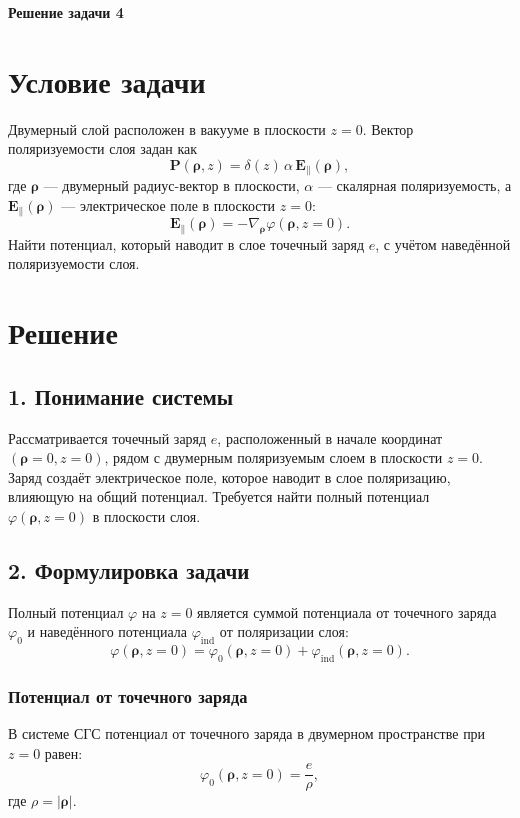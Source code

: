 \documentclass{article}
\begin{document}
\textbf{Решение задачи 4}

\section*{Условие задачи}

Двумерный слой расположен в вакууме в плоскости \( z = 0 \). Вектор поляризуемости слоя задан как
\[
\mathbf{P}(\bm{\rho}, z) = \delta(z)\, \alpha\, \mathbf{E}_{\parallel}(\bm{\rho}),
\]
где \( \bm{\rho} \) — двумерный радиус-вектор в плоскости, \( \alpha \) — скалярная поляризуемость, а \( \mathbf{E}_{\parallel}(\bm{\rho}) \) — электрическое поле в плоскости \( z = 0 \):
\[
\mathbf{E}_{\parallel}(\bm{\rho}) = -\nabla_{\bm{\rho}} \varphi(\bm{\rho}, z = 0).
\]
Найти потенциал, который наводит в слое точечный заряд \( e \), с учётом наведённой поляризуемости слоя.

\section*{Решение}

\subsection*{1. Понимание системы}

Рассматривается точечный заряд \( e \), расположенный в начале координат \( (\bm{\rho} = 0, z = 0) \), рядом с двумерным поляризуемым слоем в плоскости \( z = 0 \). Заряд создаёт электрическое поле, которое наводит в слое поляризацию, влияющую на общий потенциал. Требуется найти полный потенциал \( \varphi(\bm{\rho}, z = 0) \) в плоскости слоя.

\subsection*{2. Формулировка задачи}

Полный потенциал \( \varphi \) на \( z = 0 \) является суммой потенциала от точечного заряда \( \varphi_0 \) и наведённого потенциала \( \varphi_{\text{ind}} \) от поляризации слоя:
\[
\varphi(\bm{\rho}, z = 0) = \varphi_0(\bm{\rho}, z = 0) + \varphi_{\text{ind}}(\bm{\rho}, z = 0).
\]

\subsubsection*{Потенциал от точечного заряда}

В системе СГС потенциал от точечного заряда в двумерном пространстве при \( z = 0 \) равен:
\[
\varphi_0(\bm{\rho}, z = 0) = \frac{e}{\rho},
\]
где \( \rho = |\bm{\rho}| \).
\end{document}
